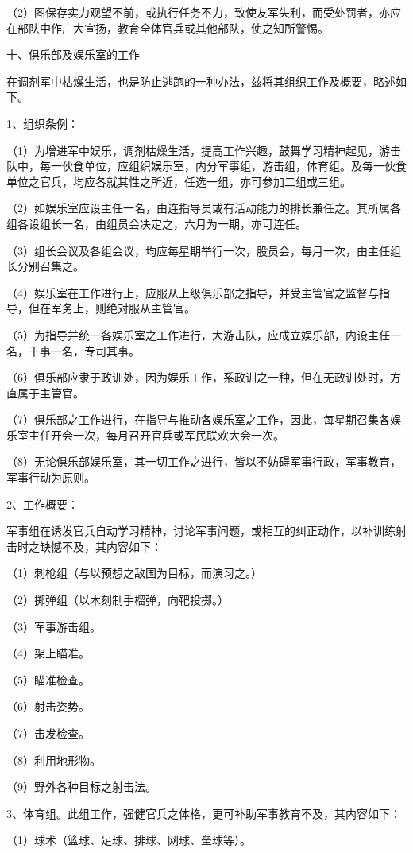 （2）图保存实力观望不前，或执行任务不力，致使友军失利，而受处罚者，亦应在部队中作广大宣扬，教育全体官兵或其他部队，使之知所警惕。

十、俱乐部及娱乐室的工作

在调剂军中枯燥生活，也是防止逃跑的一种办法，兹将其组织工作及概要，略述如下。

1、组织条例：

（1）为增进军中娱乐，调剂枯燥生活，提高工作兴趣，鼓舞学习精神起见，游击队中，每一伙食单位，应组织娱乐室，内分军事组，游击组，体育组。及每一伙食单位之官兵，均应各就其性之所近，任选一组，亦可参加二组或三组。

（2）如娱乐室应设主任一名，由连指导员或有活动能力的排长兼任之。其所属各组各设组长一名，由组员会决定之，六月为一期，亦可连任。

（3）组长会议及各组会议，均应每星期举行一次，股员会，每月一次，由主任组长分别召集之。

（4）娱乐室在工作进行上，应服从上级俱乐部之指导，并受主管官之监督与指导，但在军务上，则绝对服从主管官。

（5）为指导并统一各娱乐室之工作进行，大游击队，应成立娱乐部，内设主任一名，干事一名，专司其事。

（6）俱乐部应隶于政训处，因为娱乐工作，系政训之一种，但在无政训处时，方直属于主管官。

（7）俱乐部之工作进行，在指导与推动各娱乐室之工作，因此，每星期召集各娱乐室主任开会一次，每月召开官兵或军民联欢大会一次。

（8）无论俱乐部娱乐室，其一切工作之进行，皆以不妨碍军事行政，军事教育，军事行动为原则。

2、工作概要：

军事组在诱发官兵自动学习精神，讨论军事问题，或相互的纠正动作，以补训练射击时之缺憾不及，其内容如下：

（1）刺枪组（与以预想之敌国为目标，而演习之。）

（2）掷弹组（以木刻制手榴弹，向靶投掷。）

（3）军事游击组。

（4）架上瞄准。

（5）瞄准检查。

（6）射击姿势。

（7）击发检查。

（8）利用地形物。

（9）野外各种目标之射击法。

3、体育组。此组工作，强健官兵之体格，更可补助军事教育不及，其内容如下：

（1）球术（篮球、足球、排球、网球、垒球等）。


